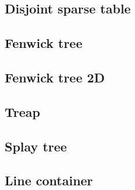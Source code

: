 \subsection{Disjoint sparse table}

\subsection{Fenwick tree}

\subsection{Fenwick tree 2D}

\subsection{Treap}

\subsection{Splay tree}

\subsection{Line container}
